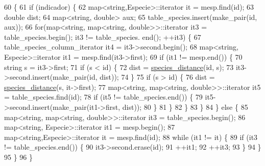 \begin{DoxyCode}
60                                                                     \{
61     \textcolor{keywordflow}{if} (indicador) \{
62         map<string,Especie>::iterator it = mesp.find(\textcolor{keywordtype}{id});
63         \textcolor{keywordtype}{double} dist;
64         map<string, double> aux;
65         table\_species.insert(make\_pair(\textcolor{keywordtype}{id}, aux));
66         \textcolor{keywordflow}{for}(map<\textcolor{keywordtype}{string}, map<string, double>>::iterator it3 = table\_species.begin(); it3 != table\_species.
      end(); ++it3) \{
67             table\_species\_column\_iterator it4 = it3->second.begin();
68             map<string, Especie>::iterator it1 = mesp.find(it3->first);
69             \textcolor{keywordflow}{if} (it1 != mesp.end()) \{
70                 \textcolor{keywordtype}{string} s = it3->first;
71                 \textcolor{keywordflow}{if} (s < \textcolor{keywordtype}{id}) \{
72                     dist = \hyperlink{class_cjt___especies_abf55093b325fd101ef73aa18dd1cf823}{species\_distance}(\textcolor{keywordtype}{id}, s);                        
73                     it3->second.insert(make\_pair(\textcolor{keywordtype}{id}, dist));
74                 \}
75                 \textcolor{keywordflow}{if} (s > \textcolor{keywordtype}{id}) \{
76                     dist = \hyperlink{class_cjt___especies_abf55093b325fd101ef73aa18dd1cf823}{species\_distance}(s, it->first);
77                     map<string, map<string, double>>::iterator it5 = table\_species.find(\textcolor{keywordtype}{id});
78                     \textcolor{keywordflow}{if} (it5 != table\_species.end()) \{                            
79                         it5->second.insert(make\_pair(it1->first, dist));
80                     \}
81                 \}
82             \}
83         \} 
84     \} \textcolor{keywordflow}{else} \{
85         map<string, map<string, double>>::iterator it3 = table\_species.begin();
86         map<string, Especie>::iterator it1 = mesp.begin();
87         map<string,Especie>::iterator it = mesp.find(\textcolor{keywordtype}{id});
88         \textcolor{keywordflow}{while} (it1 != it) \{
89             \textcolor{keywordflow}{if} (it3 != table\_species.end()) \{
90                 it3->second.erase(\textcolor{keywordtype}{id});
91                 ++it1;
92                 ++it3;
93             \}        
94         \}
95     \}
96 \}
\end{DoxyCode}
\mbox{\label{class_cjt___especies_abf55093b325fd101ef73aa18dd1cf823}} 
